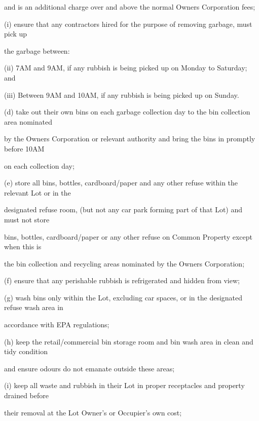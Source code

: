 \documentclass{article}
\begin{document}
{\fontsize{10.02}{1}and is an additional charge over and above the normal Owners Corporation fees; }

{\fontsize{9.962}{1}(i) ensure that any contractors hired for the purpose of removing garbage, must pick up }

{\fontsize{10.02}{1}the garbage between: }

{\fontsize{9.962}{1}(ii) 7AM and 9AM, if any rubbish is being picked up on Monday to Saturday; and }


{\fontsize{9.962}{1}(iii) Between 9AM and 10AM, if any rubbish is being picked up on Sunday. }

{\fontsize{9.962}{1}(d) take out their own bins on each garbage collection day to the bin collection area nominated }

{\fontsize{10.02}{1}by the Owners Corporation or relevant authority and bring the bins in promptly before 10AM }

{\fontsize{10.02}{1}on each collection day; }

{\fontsize{9.962}{1}(e) store all bins, bottles, cardboard/paper and any other refuse within the relevant Lot or in the }

{\fontsize{10.02}{1}designated refuse room, (but not any car park forming part of that Lot) and must not store }

{\fontsize{10.02}{1}bins, bottles, cardboard/paper or any other refuse on Common Property except when this is }

{\fontsize{10.02}{1}the bin collection and recycling areas nominated by the Owners Corporation; }

{\fontsize{9.962}{1}(f) ensure that any perishable rubbish is refrigerated and hidden from view; }

{\fontsize{9.962}{1}(g) wash bins only within the Lot, excluding car spaces, or in the designated refuse wash area in }

{\fontsize{10.02}{1}accordance with EPA regulations; }

{\fontsize{9.962}{1}(h) keep the retail/commercial bin storage room and bin wash area in clean and tidy condition }

{\fontsize{10.02}{1}and ensure odours do not emanate outside these areas; }

{\fontsize{9.962}{1}(i) keep all waste and rubbish in their Lot in proper receptacles and property drained before }

{\fontsize{10.02}{1}their removal at the Lot Owner’s or Occupier’s own cost; }
\end{document}
